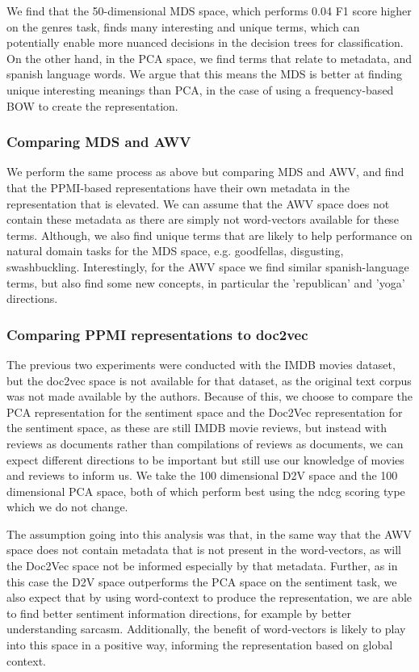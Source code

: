 We find that the 50-dimensional MDS space, which performs 0.04 F1 score higher on the genres task, finds many interesting and unique terms, which can potentially enable more nuanced decisions in the decision trees for classification. On the other hand, in the PCA space, we find terms that relate to metadata, and spanish language words. We argue that this means the MDS is better at finding unique interesting meanings than PCA, in the case of using a frequency-based BOW to create the representation.

\subsubsection{Comparing MDS and AWV}

We perform the same process as above but comparing MDS and AWV, and find that the PPMI-based representations have their own metadata in the representation that is elevated. We can assume that the AWV space does not contain these metadata as there are simply not word-vectors available for these terms. Although, we also find unique terms that are likely to help performance on natural domain tasks for the MDS space, e.g. goodfellas, disgusting, swashbuckling. Interestingly, for the AWV space we find similar spanish-language terms, but also find some new concepts, in particular the 'republican' and 'yoga' directions.

\subsubsection{Comparing PPMI representations to doc2vec}

The previous two experiments were conducted with the IMDB movies dataset, but the doc2vec space is not available for that dataset, as the original text corpus was not made available by the authors. Because of this, we choose to compare the PCA representation for the sentiment space and the Doc2Vec representation for the sentiment space, as these are still IMDB movie reviews, but instead with reviews as documents rather than compilations of reviews as documents, we can expect different directions to be important but still use our knowledge of movies and reviews to inform us. We take the 100 dimensional D2V space and the 100 dimensional PCA space, both of which perform best using the ndcg scoring type which we do not change.

The assumption going into this analysis was that, in the same way that the AWV space does not contain metadata that is not present in the word-vectors, as will the Doc2Vec space not be informed especially by that metadata. Further, as in this case the D2V space outperforms the PCA space on the sentiment task, we also expect that by using word-context to produce the representation, we are able to find better sentiment information directions, for example by better understanding sarcasm. Additionally, the benefit of word-vectors is likely to play into this space in a positive way, informing the representation based on global context. 

